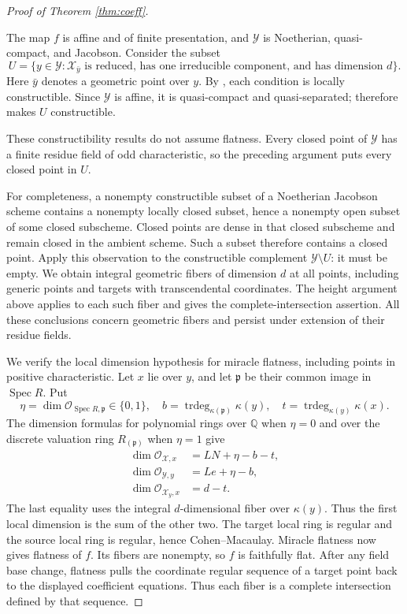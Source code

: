\documentclass[11pt]{article}
\numberwithin{equation}{section}
\theoremstyle{remark}
\newcommand{\Spec}{\operatorname{Spec}}
\begin{document}
\begin{proof}[Proof of Theorem \ref{thm:coeff}]
\begin{samepage}
The map $f$ is affine and of finite presentation, and $\mathcal Y$
is Noetherian, quasi-compact, and Jacobson. Consider the subset
\[
 U=\{y\in\mathcal Y: \mathcal X_{\bar y}
       \text{ is reduced, has one irreducible component,
       and has dimension }d\}.
\]
Here $\bar y$ denotes a geometric point over $y$.
By \cite[Tags 0579, 055B, 05F9]{Stacks}, each condition is locally
constructible. Since $\mathcal Y$ is affine, it is quasi-compact and
quasi-separated; \cite[Tag 054E]{Stacks} therefore makes $U$ constructible.\par
\end{samepage}

These constructibility results do not assume flatness.
Every closed point of $\mathcal Y$ has a finite
residue field of odd characteristic, so the preceding argument
puts every closed point in $U$.

For completeness, a nonempty constructible subset of a Noetherian
Jacobson scheme contains a nonempty locally closed subset, hence a
nonempty open subset of some closed subscheme. Closed points are
dense in that closed subscheme and remain closed in the ambient
scheme. Such a subset therefore contains a closed point.
Apply this observation to the constructible complement
$\mathcal Y\setminus U$: it must be empty. We obtain integral
geometric fibers of dimension $d$ at all points, including generic
points and targets with transcendental coordinates. The height
argument above applies to each such fiber and gives the
complete-intersection assertion. All these conclusions concern
geometric fibers and persist under extension of their residue fields.

We verify the local dimension hypothesis for miracle flatness,
including points in positive characteristic. Let $x$ lie over $y$,
and let $\mathfrak p$ be their common image in $\Spec R$. Put
\[
 \eta=\dim\mathcal O_{\Spec R,\mathfrak p}\in\{0,1\},\quad
 b=\operatorname{trdeg}_{\kappa(\mathfrak p)}\kappa(y),\quad
 t=\operatorname{trdeg}_{\kappa(y)}\kappa(x).
\]
The dimension formulas for polynomial rings over $\mathbb Q$ when $\eta=0$
and over the discrete valuation ring $R_{(\mathfrak p)}$ when $\eta=1$ give
\begin{align*}
 \dim\mathcal O_{\mathcal X,x}&=LN+\eta-b-t,\\
 \dim\mathcal O_{\mathcal Y,y}&=Le+\eta-b,\\
 \dim\mathcal O_{\mathcal X_y,x}&=d-t.
\end{align*}
The last equality uses the integral $d$-dimensional fiber over
$\kappa(y)$. Thus the first local dimension is the sum of the
other two. The target local ring is regular and the source local
ring is regular, hence Cohen--Macaulay. Miracle flatness
\cite[Tag 00R4]{Stacks} now gives flatness of $f$.
Its fibers are nonempty, so $f$ is faithfully flat. After any field
base change, flatness pulls the coordinate regular sequence of a
target point back to the displayed coefficient equations. Thus
each fiber is a complete intersection defined by that sequence.


\end{proof}
\end{document}

